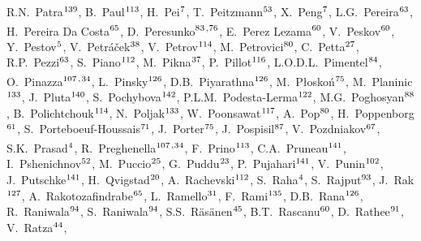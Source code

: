 \begin{flushleft}
R.N.~Patra$^\textrm{\scriptsize 139}$,
B.~Paul$^\textrm{\scriptsize 113}$,
H.~Pei$^\textrm{\scriptsize 7}$,
T.~Peitzmann$^\textrm{\scriptsize 53}$,
X.~Peng$^\textrm{\scriptsize 7}$,
L.G.~Pereira$^\textrm{\scriptsize 63}$,
H.~Pereira Da Costa$^\textrm{\scriptsize 65}$,
D.~Peresunko$^\textrm{\scriptsize 83}$\textsuperscript{,}$^\textrm{\scriptsize 76}$,
E.~Perez Lezama$^\textrm{\scriptsize 60}$,
V.~Peskov$^\textrm{\scriptsize 60}$,
Y.~Pestov$^\textrm{\scriptsize 5}$,
V.~Petr\'{a}\v{c}ek$^\textrm{\scriptsize 38}$,
V.~Petrov$^\textrm{\scriptsize 114}$,
M.~Petrovici$^\textrm{\scriptsize 80}$,
C.~Petta$^\textrm{\scriptsize 27}$,
R.P.~Pezzi$^\textrm{\scriptsize 63}$,
S.~Piano$^\textrm{\scriptsize 112}$,
M.~Pikna$^\textrm{\scriptsize 37}$,
P.~Pillot$^\textrm{\scriptsize 116}$,
L.O.D.L.~Pimentel$^\textrm{\scriptsize 84}$,
O.~Pinazza$^\textrm{\scriptsize 107}$\textsuperscript{,}$^\textrm{\scriptsize 34}$,
L.~Pinsky$^\textrm{\scriptsize 126}$,
D.B.~Piyarathna$^\textrm{\scriptsize 126}$,
M.~P\l osko\'{n}$^\textrm{\scriptsize 75}$,
M.~Planinic$^\textrm{\scriptsize 133}$,
J.~Pluta$^\textrm{\scriptsize 140}$,
S.~Pochybova$^\textrm{\scriptsize 142}$,
P.L.M.~Podesta-Lerma$^\textrm{\scriptsize 122}$,
M.G.~Poghosyan$^\textrm{\scriptsize 88}$,
B.~Polichtchouk$^\textrm{\scriptsize 114}$,
N.~Poljak$^\textrm{\scriptsize 133}$,
W.~Poonsawat$^\textrm{\scriptsize 117}$,
A.~Pop$^\textrm{\scriptsize 80}$,
H.~Poppenborg$^\textrm{\scriptsize 61}$,
S.~Porteboeuf-Houssais$^\textrm{\scriptsize 71}$,
J.~Porter$^\textrm{\scriptsize 75}$,
J.~Pospisil$^\textrm{\scriptsize 87}$,
V.~Pozdniakov$^\textrm{\scriptsize 67}$,
S.K.~Prasad$^\textrm{\scriptsize 4}$,
R.~Preghenella$^\textrm{\scriptsize 107}$\textsuperscript{,}$^\textrm{\scriptsize 34}$,
F.~Prino$^\textrm{\scriptsize 113}$,
C.A.~Pruneau$^\textrm{\scriptsize 141}$,
I.~Pshenichnov$^\textrm{\scriptsize 52}$,
M.~Puccio$^\textrm{\scriptsize 25}$,
G.~Puddu$^\textrm{\scriptsize 23}$,
P.~Pujahari$^\textrm{\scriptsize 141}$,
V.~Punin$^\textrm{\scriptsize 102}$,
J.~Putschke$^\textrm{\scriptsize 141}$,
H.~Qvigstad$^\textrm{\scriptsize 20}$,
A.~Rachevski$^\textrm{\scriptsize 112}$,
S.~Raha$^\textrm{\scriptsize 4}$,
S.~Rajput$^\textrm{\scriptsize 93}$,
J.~Rak$^\textrm{\scriptsize 127}$,
A.~Rakotozafindrabe$^\textrm{\scriptsize 65}$,
L.~Ramello$^\textrm{\scriptsize 31}$,
F.~Rami$^\textrm{\scriptsize 135}$,
D.B.~Rana$^\textrm{\scriptsize 126}$,
R.~Raniwala$^\textrm{\scriptsize 94}$,
S.~Raniwala$^\textrm{\scriptsize 94}$,
S.S.~R\"{a}s\"{a}nen$^\textrm{\scriptsize 45}$,
B.T.~Rascanu$^\textrm{\scriptsize 60}$,
D.~Rathee$^\textrm{\scriptsize 91}$,
V.~Ratza$^\textrm{\scriptsize 44}$,

\end{flushleft}
